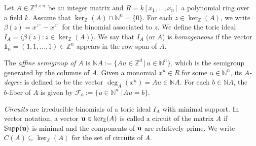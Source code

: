 \documentclass[a4paper, 12pt]{article}
\newcommand{\NN}{\mathbb N}
\newcommand{\RR}{\mathbb R}
\newcommand{\ZZ}{\mathbb Z}
\theoremstyle{plain}
\theoremstyle{definition}
\theoremstyle{remark}
\begin{document}
Let $A \in \ZZ^{d \times n}$ be an integer matrix and $R = k[x_1, \dots, x_n]$ a polynomial ring over a field $k$. Assume that $\ker_\ZZ(A) \cap \NN^n = \{0\}$. For each $z \in \ker_\ZZ(A)$, we write $\beta(z) = x^{z^{+}} - x^{z^-}$ for the binomial associated to $z$. We define the toric ideal $I_A = \langle  \beta(z) : z \in \ker_\ZZ(A) \rangle$. 
We say that $I_A$ (or $A$) is \textit{homogeneous} if the vector $\mathbf{1}_n = (1,1, \dots, 1) \in \ZZ^n$ appears in the row-span of $A$.

The \textit{affine semigroup of $A$} is $\NN A := \{Au \in \ZZ^d \,|\, u \in \NN^n\}$, which is the semigroup generated by the columns of $A$. %
Given a monomial $x^u \in R$ for some $u \in \NN^n$, its \textit{$A$-degree} is defined to be the vector $\deg_A(x^u) = Au \in \NN A$. 
For each $b \in \NN A$, the $b$-fiber of $A$ is given by $\mathcal F_b := \{u \in \NN^n \,|\, Au = b\}$.

{\em Circuits} are irreducible binomials of a toric ideal $I_A$ with minimal support. In vector notation, a vector ${\bf u}\in \ker_{\ZZ}(A)$ is called a circuit of the matrix $A$ if $\operatorname{Supp}({\bf u})$ is minimal and the components of ${\bf u}$ are relatively prime. We write $C(A) \subseteq \ker_\ZZ(A)$ for the set of circuits of $A$.

\end{document}
